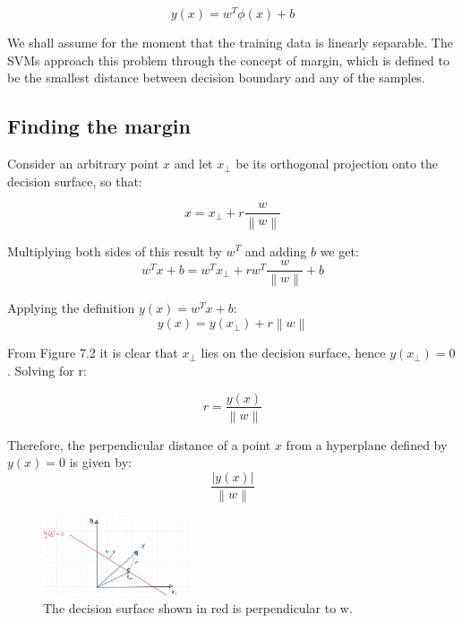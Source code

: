 \documentclass[twoside]{article}
\newcommand{\norm}[1]{\left\lVert #1 \right\rVert}
\begin{document}
\begin{equation*}
    y(x) = w^T  \phi(x) + b
\end{equation*}

We shall assume for the moment that the training data is linearly separable. The SVMs approach this problem through the concept of margin, which is defined to be the smallest distance between decision boundary and any of the samples. 

\subsection{Finding the margin}

Consider an arbitrary point $x$ and let $x_{\bot}$ be its orthogonal projection onto the decision surface, so that:

\begin{equation*}
    x = x_{\bot} + r  \dfrac{w}{\norm{w}}
\end{equation*}
    
Multiplying both sides of this result by $w^T$ and adding $b$ we get:
\begin{equation*}
    w^T  x + b = w^T  x_{\bot} + r w^T  \dfrac{w}{\norm{w}} + b
\end{equation*}

Applying the definition $y(x) = w^T  x + b$:
\begin{equation*}
    y(x) = y(x_{\bot}) + r  \norm{w}
\end{equation*}

From Figure 7.2 it is clear that $x_{\bot}$ lies on the decision surface, hence $y(x_{\bot})=0$. Solving for r:

\begin{equation*}
    r = \dfrac{y(x)}{\norm{w}}
\end{equation*}

Therefore, the perpendicular distance of a point $x$ from a hyperplane defined by $y(x)=0$ is given by:
\begin{equation*}
    \dfrac{\lvert y(x) \rvert}{\norm{w}}
\end{equation*}
\begin{figure}[h]
\caption{The decision surface shown in red is perpendicular to w.}
\centering
\includegraphics[width=0.385\textwidth]{img/margin.jpg}
\end{figure}
\end{document}
